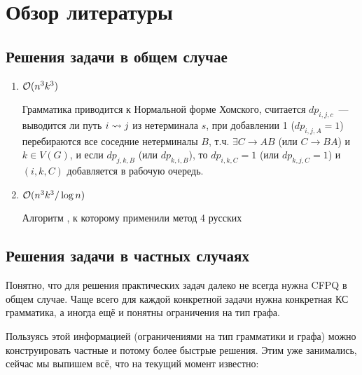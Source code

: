 \section{Обзор литературы}

\subsection{Решения задачи в общем случае}

\begin{enumerate}
    \item $\mathcal{O}(n^3 k^3)$ \cite{Reps97}

    Грамматика приводится к Нормальной форме Хомского, считается $dp_{i,j,c}$~--- выводится ли путь $i \rightsquigarrow j$ из нетерминала $s$, при добавлении 1 ($dp_{i,j,A} = 1$) перебираются все соседние нетерминалы $B$, т.ч. $\exists C \to AB$ (или $C \to BA$) и $k \in V(G)$, и если $dp_{j, k, B}$ (или $dp_{k, i, B}$), то $dp_{i, k, C} = 1$ (или $dp_{k, j, C} = 1$) и $(i, k, C)$ добавляется в рабочую очередь.

    \item $\mathcal{O}(n^3 k^3 / \log n)$ \cite{Chaudhuri08}

    Алгоритм \cite{Reps97}, к которому применили метод 4 русских

\end{enumerate}

\subsection{Решения задачи в частных случаях}

Понятно, что для решения практических задач далеко не всегда нужна CFPQ в общем случае. Чаще всего для каждой конкретной задачи нужна конкретная КС грамматика, а иногда ещё и понятны ограничения на тип графа.

Пользуясь этой информацией (ограничениями на тип грамматики и графа) можно конструировать частные и потому более быстрые решения. Этим уже занимались, сейчас мы выпишем всё, что на текущий момент известно:


